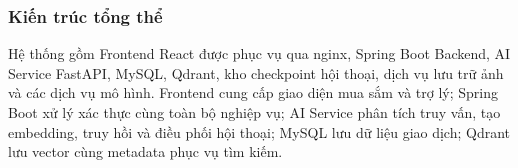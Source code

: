 
\subsubsection{Kiến trúc tổng thể}

Hệ thống gồm Frontend React được phục vụ qua nginx, Spring Boot Backend, AI Service FastAPI, MySQL, Qdrant, kho checkpoint hội thoại, dịch vụ lưu trữ ảnh và các dịch vụ mô hình. Frontend cung cấp giao diện mua sắm và trợ lý; Spring Boot xử lý xác thực cùng toàn bộ nghiệp vụ; AI Service phân tích truy vấn, tạo embedding, truy hồi và điều phối hội thoại; MySQL lưu dữ liệu giao dịch; Qdrant lưu vector cùng metadata phục vụ tìm kiếm.


